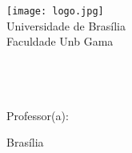
\begin{titlepage}
        \begin{center}
            \texttt{[image: logo.jpg]}\\[0.3cm]
            {\large Universidade de Brasília}\\[0.2cm]
            {\large Faculdade Unb Gama}\\[0.2cm]
            {\large \discipline}\\[4.1cm]
            {\bf \huge \mainTitle}\\[4.1cm]
        \end{center}
        \raggedleft{\normalsize \myid}\\[0.7cm]
        {\normalsize Professor(a): \teacher}
        \vfill
        \begin{center}
            {\large Brasília}\\[0.2cm]
            {\large \the\year}
        \end{center}
\end{titlepage}
